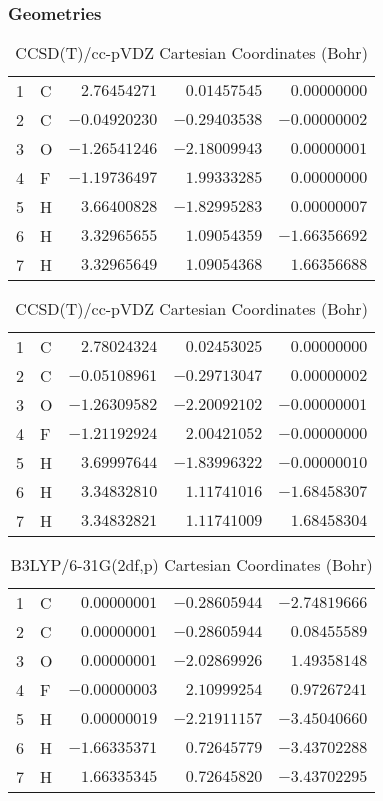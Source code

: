 \documentclass[10pt,oneside]{article}
\begin{document}
\begin{table}[h!]
\subsubsection*{Geometries}
\begin{multicols}{2}
\centering
\caption{CCSD(T)/cc-pVTZ Cartesian Coordinates (Bohr)}
\begin{tabular}{llrrr}
\toprule
1  & C  & $ 2.76454271$ & $ 0.01457545$ & $ 0.00000000$ \\
2  & C  & $-0.04920230$ & $-0.29403538$ & $-0.00000002$ \\
3  & O  & $-1.26541246$ & $-2.18009943$ & $ 0.00000001$ \\
4  & F  & $-1.19736497$ & $ 1.99333285$ & $ 0.00000000$ \\
5  & H  & $ 3.66400828$ & $-1.82995283$ & $ 0.00000007$ \\
6  & H  & $ 3.32965655$ & $ 1.09054359$ & $-1.66356692$ \\
7  & H  & $ 3.32965649$ & $ 1.09054368$ & $ 1.66356688$ \\
\bottomrule
\end{tabular}
\caption{CCSD(T)/cc-pVDZ Cartesian Coordinates (Bohr)}
\begin{tabular}{llrrr}
\toprule
1  & C  & $ 2.78024324$ & $ 0.02453025$ & $ 0.00000000$ \\
2  & C  & $-0.05108961$ & $-0.29713047$ & $ 0.00000002$ \\
3  & O  & $-1.26309582$ & $-2.20092102$ & $-0.00000001$ \\
4  & F  & $-1.21192924$ & $ 2.00421052$ & $-0.00000000$ \\
5  & H  & $ 3.69997644$ & $-1.83996322$ & $-0.00000010$ \\
6  & H  & $ 3.34832810$ & $ 1.11741016$ & $-1.68458307$ \\
7  & H  & $ 3.34832821$ & $ 1.11741009$ & $ 1.68458304$ \\
\bottomrule
\end{tabular}
\end{multicols}
\end{table}

\begin{table}[h]
\centering
\caption{B3LYP/6-31G(2df,p) Cartesian Coordinates (Bohr)}
\begin{tabular}{llrrr}
\toprule
1  & C  & $ 0.00000001$ & $-0.28605944$ & $-2.74819666$ \\
2  & C  & $ 0.00000001$ & $-0.28605944$ & $ 0.08455589$ \\
3  & O  & $ 0.00000001$ & $-2.02869926$ & $ 1.49358148$ \\
4  & F  & $-0.00000003$ & $ 2.10999254$ & $ 0.97267241$ \\
5  & H  & $ 0.00000019$ & $-2.21911157$ & $-3.45040660$ \\
6  & H  & $-1.66335371$ & $ 0.72645779$ & $-3.43702288$ \\
7  & H  & $ 1.66335345$ & $ 0.72645820$ & $-3.43702295$ \\
\bottomrule
\end{tabular}
\end{table}
\end{document}
